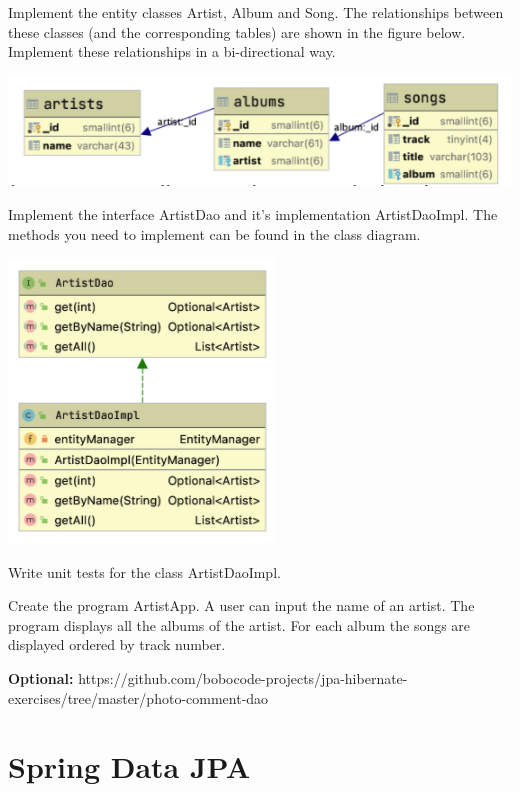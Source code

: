 \begin{oefening}
Implement the entity classes Artist, Album and Song. The relationships between these classes (and the corresponding tables) are shown in the figure below.  Implement these relationships in a bi-directional way.

\includegraphics[width=\textwidth]{./images/chapter6/exercise-schema}

Implement the interface ArtistDao and it's implementation ArtistDaoImpl. The methods you need to implement can be found in the class diagram.

\includegraphics{./images/chapter6/exercise-dao}

Write unit tests for the class ArtistDaoImpl.

Create the program ArtistApp. A user can input the name of an artist. The program displays all the albums of the artist. For each album the songs are displayed ordered by track number.
\end{oefening}


\begin{oefening}
\textbf{Optional:} 
https://github.com/bobocode-projects/jpa-hibernate-exercises/tree/master/photo-comment-dao
\end{oefening}


\section{Spring Data JPA}

